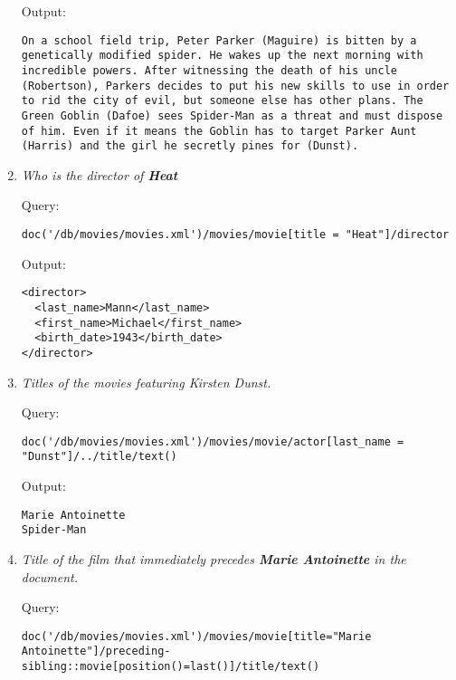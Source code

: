 \documentclass[a4paper, notitlepage]{article}
\begin{document}
\begin{enumerate}
Output:
  
\begin{lstlisting}
On a school field trip, Peter Parker (Maguire) is bitten by a genetically modified spider. He wakes up the next morning with incredible powers. After witnessing the death of his uncle (Robertson), Parkers decides to put his new skills to use in order to rid the city of evil, but someone else has other plans. The Green Goblin (Dafoe) sees Spider-Man as a threat and must dispose of him. Even if it means the Goblin has to target Parker Aunt (Harris) and the girl he secretly pines for (Dunst).
\end{lstlisting}  

\item 
  \emph{Who is the director of \textbf{Heat}} 
  
Query: 
  
\begin{lstlisting}
doc('/db/movies/movies.xml')/movies/movie[title = "Heat"]/director
\end{lstlisting}
  
Output:
  
\begin{lstlisting}
<director>
  <last_name>Mann</last_name>
  <first_name>Michael</first_name>
  <birth_date>1943</birth_date>
</director>
\end{lstlisting}  
  
\item 
  \emph{Titles of the movies featuring Kirsten Dunst.} 
  
Query: 
  
\begin{lstlisting}
doc('/db/movies/movies.xml')/movies/movie/actor[last_name = "Dunst"]/../title/text()
\end{lstlisting}
  
Output:
  
\begin{lstlisting}
Marie Antoinette
Spider-Man
\end{lstlisting}   

\item 
  \emph{Title of the film that immediately precedes \textbf{Marie Antoinette} in the document.} 
  
Query: 
  
\begin{lstlisting}
doc('/db/movies/movies.xml')/movies/movie[title="Marie Antoinette"]/preceding-sibling::movie[position()=last()]/title/text()
\end{lstlisting}
  

\end{enumerate}
\end{document}

